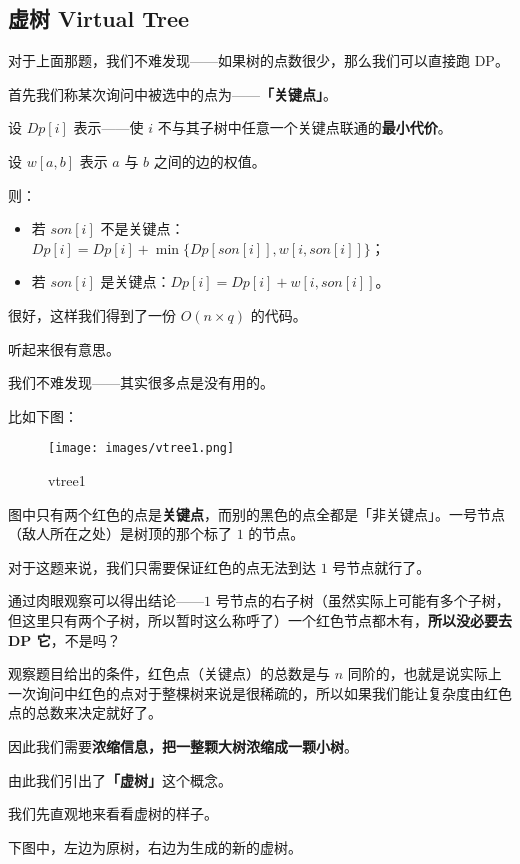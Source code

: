 {\subsection{虚树 Virtual Tree}

对于上面那题，我们不难发现——如果树的点数很少，那么我们可以直接跑 DP。

首先我们称某次询问中被选中的点为——\textbf{「关键点」}。

设 $Dp[i]$ 表示——使 $i$ 不与其子树中任意一个关键点联通的\textbf{最小代价}。

设 $w[a,b]$ 表示 $a$ 与 $b$ 之间的边的权值。

则：

\begin{itemize}
\item 若 $son[i]$ 不是关键点：$Dp[i]=Dp[i] + \min \{Dp[son[i]],w[i,son[i]]\}$；
\item 若 $son[i]$ 是关键点：$Dp[i]=Dp[i] + w[i,son[i]]$。
\end{itemize}

很好，这样我们得到了一份 $O(n\times q)$ 的代码。

听起来很有意思。

我们不难发现——其实很多点是没有用的。

比如下图：

\begin{figure}[h]
\centering
\texttt{[image: images/vtree1.png]} 
\caption{vtree1}
\end{figure}

图中只有两个红色的点是\textbf{关键点}，而别的黑色的点全都是「非关键点」。一号节点（敌人所在之处）是树顶的那个标了 $1$ 的节点。

对于这题来说，我们只需要保证红色的点无法到达 $1$ 号节点就行了。

通过肉眼观察可以得出结论——$1$ 号节点的右子树（虽然实际上可能有多个子树，但这里只有两个子树，所以暂时这么称呼了）一个红色节点都木有，\textbf{所以没必要去 DP 它}，不是吗？

观察题目给出的条件，红色点（关键点）的总数是与 $n$ 同阶的，也就是说实际上一次询问中红色的点对于整棵树来说是很稀疏的，所以如果我们能让复杂度由红色点的总数来决定就好了。

因此我们需要\textbf{浓缩信息，把一整颗大树浓缩成一颗小树}。

由此我们引出了\textbf{「虚树」}这个概念。

我们先直观地来看看虚树的样子。

下图中，左边为原树，右边为生成的新的虚树。

}
